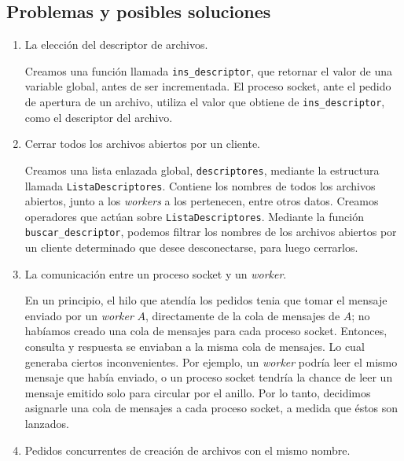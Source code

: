 \documentclass[a4paper, 8pt]{article}
\begin{document}
\subsection{Problemas y posibles soluciones}
  \begin{enumerate}
    \item La elección del descriptor de archivos.
    
    Creamos una función llamada \texttt{ins\_descriptor}, que retornar el valor de una variable global, antes de ser incrementada.
    El proceso socket, ante el pedido de apertura de un archivo, utiliza el valor que obtiene de \texttt{ins\_descriptor}, como el descriptor del archivo.

    
    \item Cerrar todos los archivos abiertos por un cliente.
    
    Creamos una lista enlazada global, \texttt{descriptores}, mediante la estructura llamada \texttt{ListaDescriptores}. Contiene los nombres de todos los archivos abiertos, junto a los \textit{workers} a los pertenecen, entre otros datos.
    Creamos operadores que actúan sobre \texttt{ListaDescriptores}.
    Mediante la función \texttt{buscar\_descriptor}, podemos filtrar los nombres de los archivos abiertos por un cliente determinado que desee desconectarse, para luego cerrarlos.
    
    \item La comunicación entre un proceso socket y un \textit{worker}.
    
    En un principio, el hilo que atendía los pedidos tenia que tomar el mensaje enviado por un \textit{worker} $A$, directamente de la cola de mensajes de $A$;
    no habíamos creado una cola de mensajes para cada proceso socket. 
    Entonces, consulta y respuesta se enviaban a la misma cola de mensajes. Lo cual generaba ciertos inconvenientes. Por ejemplo,
    un \textit{worker} podría leer el mismo mensaje que había enviado, o un proceso socket tendría la chance de
    leer un mensaje emitido solo para circular por el anillo.
    Por lo tanto, decidimos asignarle una cola de mensajes a cada proceso socket, a medida que éstos son lanzados.
    
    \item Pedidos concurrentes de creación de archivos con el mismo nombre.
    
    

\end{enumerate}
\end{document}
